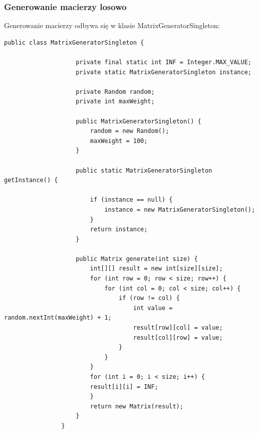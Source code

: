 \documentclass{article}
\begin{document}
		\subsubsection{Generowanie macierzy losowo}
			Generowanie macierzy odbywa się w klasie MatrixGeneratorSingleton:
			\begin{lstlisting}[xleftmargin=-150pt]
				public class MatrixGeneratorSingleton {
				
					private final static int INF = Integer.MAX_VALUE;
					private static MatrixGeneratorSingleton instance;
					
					private Random random;
					private int maxWeight;
					
					public MatrixGeneratorSingleton() {
						random = new Random();
						maxWeight = 100;
					}
										
					public static MatrixGeneratorSingleton getInstance() {
					
						if (instance == null) {
							instance = new MatrixGeneratorSingleton();
						}
						return instance;
					}
					
					public Matrix generate(int size) {
						int[][] result = new int[size][size];
						for (int row = 0; row < size; row++) {
							for (int col = 0; col < size; col++) {
								if (row != col) {
									int value = random.nextInt(maxWeight) + 1;
									result[row][col] = value;
									result[col][row] = value;
								}
							}
						}
						for (int i = 0; i < size; i++) {
						result[i][i] = INF;
						}
						return new Matrix(result);
					}
				}
			\end{lstlisting}	
		
\end{document}
